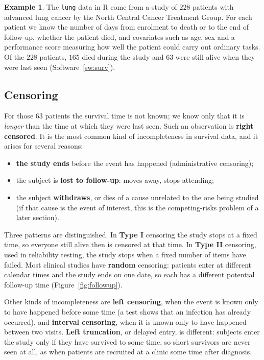 \documentclass[11pt,a4paper]{article}
\numberwithin{equation}{section}
\theoremstyle{definition}
\newtheorem{exa}[thm]{Example}
\begin{document}
\begin{exa}
\label{ex:lung}
The \texttt{lung} data in R come from a study of $228$ patients with advanced lung cancer by the North Central Cancer Treatment Group. For each patient we know the number of days from enrolment to death or to the end of follow-up, whether the patient died, and covariates such as age, sex and a performance score measuring how well the patient could
carry out ordinary tasks. Of the $228$ patients, $165$ died during the study and $63$ were still alive when they were last seen (Software~\ref{sw:surv}).
\end{exa}

\subsection{Censoring}
\label{ssec:censoring}

For those $63$ patients the survival time is not known; we know only that it is \emph{longer} than the time at which they were last seen. Such an observation is \textbf{right censored}. It is the most common kind of incompleteness in survival data, and it arises for several reasons:
\begin{itemize}
\item \textbf{the study ends} before the event has happened (administrative censoring);
\item the subject is \textbf{lost to follow-up}: moves away, stops attending;
\item the subject \textbf{withdraws}, or dies of a cause unrelated to the one being studied (if that cause is the event of interest, this is the competing-risks problem of a later section).
\end{itemize}
Three patterns are distinguished. In \textbf{Type I} censoring the study stops at a fixed time, so everyone still alive then is censored at that time. In \textbf{Type II} censoring, used in reliability testing, the study stops when a fixed number of items have failed. Most clinical studies have \textbf{random} censoring: patients enter at different
calendar times and the study ends on one date, so each has a different potential follow-up time (Figure~\ref{fig:followup}).

Other kinds of incompleteness are \textbf{left censoring}, when the event is known only to have happened before some time (a test shows that an infection has already occurred), and \textbf{interval censoring}, when it is known only to have happened between two visits. \textbf{Left truncation}, or delayed entry, is different: subjects enter the study only if they have
survived to some time, so short survivors are never seen at all, as when patients are recruited at a clinic some time after diagnosis.
\end{document}
